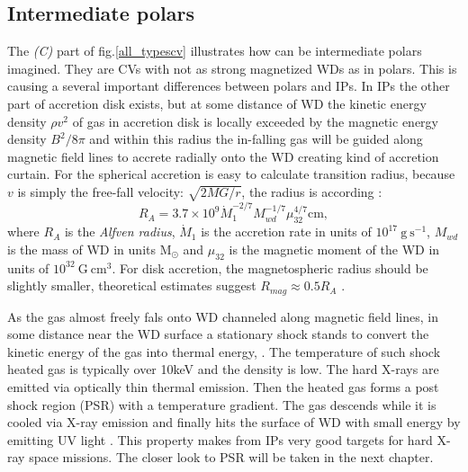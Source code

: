 \documentclass[oneside,a4paper,11pt]{report}
\begin{document}
\subsection{Intermediate polars}
The \textit{(C)} part of fig.\ref{all_typescv} illustrates how can be intermediate polars imagined. 
They are CVs with not as strong magnetized WDs as in polars. This is causing a several important 
differences between polars and IPs. In IPs the other part of accretion disk exists, but at some 
distance of WD the kinetic energy density $\rho v^2$ of gas in accretion disk is locally exceeded by the
 magnetic energy density $B^2/8\pi$ and within this radius the in-falling gas will be guided along magnetic 
field lines to accrete radially onto the WD creating kind of accretion curtain.  
For the spherical accretion is easy to calculate transition radius, because $v$ is simply the 
free-fall velocity: $\sqrt{2MG/r}$, the radius is according \citet{1994PASP..106..209P}:
\begin{equation}
\label{ipra}
R_A = 3.7 \times 10^9 \dot{M}_{1}^{-2/7}M_{wd}^{-1/7}\mu_{32}^{4/7} \mathrm{cm},
\end{equation}
where $R_A$ is the \textit{Alfven radius}, $\dot{M}_{1}$ is the accretion rate in 
units of $10^{17}\:\mathrm{g\:s^{-1}}$, $M_{wd}$ is the mass of WD in units $\mathrm{M_\odot}$ and $\mu_{32}$ is the magnetic moment 
of the WD in units of $10^{32}\:\mathrm{G\:cm^3}$. For disk accretion, the magnetospheric radius should be slightly 
smaller, theoretical estimates suggest $R_{mag} \approx 0.5R_A$ \citet{1994PASP..106..209P}.  

As the gas almost freely fals onto WD channeled along magnetic field lines, in some distance near the 
WD surface a stationary shock stands to convert the kinetic energy of the gas into thermal energy, 
\citet{2010A&A...520A..25Y}.
The temperature of such shock heated gas is typically over 10keV and the density is low. The hard X-rays 
are emitted via optically thin thermal emission. Then the heated gas forms a post shock region (PSR) 
with a temperature gradient. The gas descends while it is cooled via X-ray emission and finally hits 
the surface of WD with small energy by emitting UV light \citet{1973PThPh..49.1184A_aizu}. 
This property makes from IPs very good targets for hard X-ray space missions. The closer look to PSR 
will be taken in the next chapter.   
\end{document}
